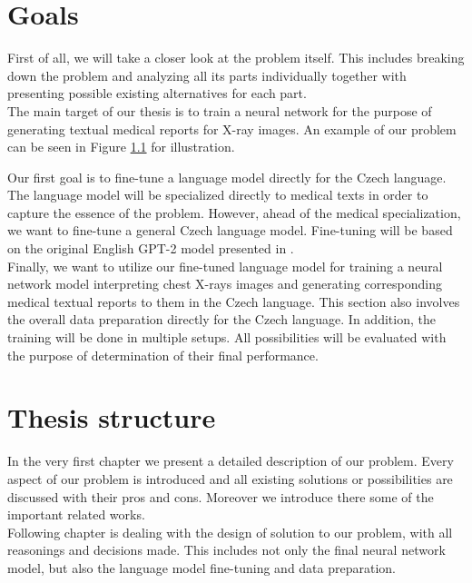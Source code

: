 \section*{Goals}
First of all, we will take a closer look at the problem itself. This includes breaking down the problem and analyzing all its parts individually together with presenting possible existing alternatives for each part. \\

The main target of our thesis is to train a neural network for the purpose of generating textual medical reports for X-ray images. An example of our problem can be seen in Figure \hyperref[fig01:ProblemExample]{1.1} for illustration.\\
\newpage

Our first goal is to fine-tune a language model directly for the Czech language. The language model will be specialized directly to medical texts in order to capture the essence of the problem. However, ahead of the medical specialization, we want to fine-tune a general Czech language model. Fine-tuning will be based on the original English GPT-2 model presented in \citet{radford2019language}.\\

Finally, we want to utilize our fine-tuned language model for training a neural network model interpreting chest X-rays images and generating corresponding medical textual reports to them in the Czech language. This section also involves the overall data preparation directly for the Czech language. In addition, the training will be done in multiple setups. All possibilities will be evaluated with the purpose of determination of their final performance.\\

\section*{Thesis structure}

In the very first chapter we present a detailed description of our problem. Every aspect of our problem is introduced and all existing solutions or possibilities are discussed with their pros and cons. Moreover we introduce there some of the important related works.\\

Following chapter is dealing with the design of solution to our problem, with all reasonings and decisions made. This includes not only the final neural network model, but also the language model fine-tuning and data preparation.\\

